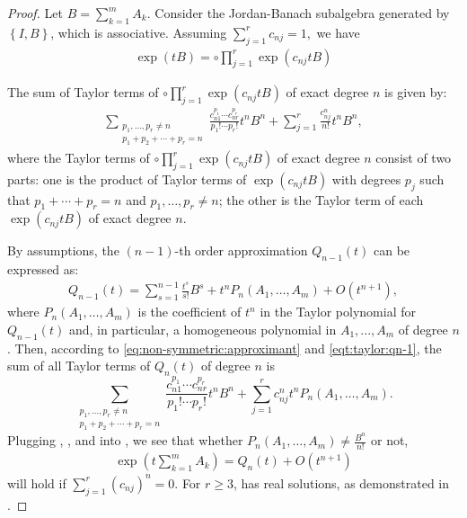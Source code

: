 \documentclass{article}
\theoremstyle{plain} %
\numberwithin{equation}{section}
\begin{document}
\begin{proof}
Let $\displaystyle B=\sum_{k=1}^m A_k.$
Consider the Jordan-Banach subalgebra generated by $\displaystyle \left\{I, B\right\}$, which is associative. Assuming  $\displaystyle \sum_{j=1}^r c_{nj}=1,$ we have
\begin{align}\label{eqt:taylor:product}
 \exp\left(tB\right)=\circ \prod_{j=1}^r \exp\left(c_{nj} tB\right) 	
\end{align}
 
The sum of Taylor terms of 
$\displaystyle \circ \prod_{j=1}^r \exp\left(c_{nj} t B\right)$ of exact degree $n$ is given by:
\begin{align}\label{eqt:taylor:approximate n:exp}
 \sum_{\substack{p_1, \dots, p_r \neq n \\ p_1 + p_2 + \cdots + p_r = n}} \frac{c_{n1}^{p_1} \cdots c_{nr}^{p_r}}{p_1! \cdots p_r!}t^n B^n  + \sum_{j=1}^r \frac{c_{nj}^n}{n!}t^n B^n,	
\end{align}
where the Taylor terms of $\displaystyle \circ \prod_{j=1}^r \exp\left(c_{nj} t B \right)$ of exact degree $n$ consist of two parts: one is the product of Taylor terms of $\displaystyle \exp\left(c_{nj} t B\right)$ with degrees $p_j$ such that $p_1 + \cdots + p_r = n$ and $p_1, \dots, p_r \neq n$; the other is the Taylor term of each $\displaystyle \exp\left(c_{nj} t B\right)$ of exact degree $n$.

By assumptions, 
the $(n-1)$-th order approximation $Q_{n-1}(t)$ can be expressed as:
\begin{align}\label{eqt:taylor:qn-1}
Q_{n-1}(t) = \sum_{s=1}^{n-1} \frac{t^s}{s!} B^s + t^n P_n(A_1, \dots, A_m) + O(t^{n+1}),	
\end{align}
where $P_n(A_1, \dots, A_m)$ is the coefficient of $t^n$ in the Taylor polynomial for $Q_{n-1}(t)$ and, in particular, a homogeneous polynomial in
$A_1, ..., A_m$ of degree $n$. Then, according to \cref{eq:non-symmetric:approximant} and \cref{eqt:taylor:qn-1}, the sum of all Taylor terms of $Q_n(t)$ of degree $n$  is
\begin{equation}\label{eqt:taylor:approximate n}
 \sum_{\substack{p_1, \dots, p_r \neq n \\ p_1 + p_2 + \cdots + p_r = n}} \frac{c_{n1}^{p_1} \cdots c_{nr}^{p_r}}{p_1! \cdots p_r!} t^n B^n + \sum_{j=1}^r c_{nj}^n t^n P_n(A_1, \dots, A_m).	 
\end{equation}
Plugging  , , and  into , we see that
whether 
$\displaystyle P_n(A_1, \dots, A_m) \neq \frac{B^n}{n!}$
or not,  
\begin{align*}
    \exp\left(t\sum_{k=1}^m A_k\right) = Q_n(t) + O(t^{n+1}) 
\end{align*}
will hold if $\displaystyle 
    \sum_{j=1}^r (c_{nj})^n = 0$.
For $r\geq 3$,   has real solutions, as demonstrated in  \cite[Eq. (16)]{suzuki:1990:fractal}.
\end{proof}
\end{document}
